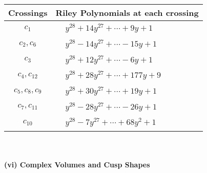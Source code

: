 \documentclass[1p]{elsarticle_modified}
\theoremstyle{definition}
\begin{document}
\begin{tabular}{m{50pt}|m{274pt}}
Crossings & \hspace{64pt}Riley Polynomials at each crossing \\
\hline $$\begin{aligned}c_{1}\end{aligned}$$&$\begin{aligned}
&y^{28}+14 y^{27}+\cdots+9 y+1
\end{aligned}$\\
\hline $$\begin{aligned}c_{2},c_{6}\end{aligned}$$&$\begin{aligned}
&y^{28}-14 y^{27}+\cdots-15 y+1
\end{aligned}$\\
\hline $$\begin{aligned}c_{3}\end{aligned}$$&$\begin{aligned}
&y^{28}+12 y^{27}+\cdots-6 y+1
\end{aligned}$\\
\hline $$\begin{aligned}c_{4},c_{12}\end{aligned}$$&$\begin{aligned}
&y^{28}+28 y^{27}+\cdots+177 y+9
\end{aligned}$\\
\hline $$\begin{aligned}c_{5},c_{8},c_{9}\end{aligned}$$&$\begin{aligned}
&y^{28}+30 y^{27}+\cdots+19 y+1
\end{aligned}$\\
\hline $$\begin{aligned}c_{7},c_{11}\end{aligned}$$&$\begin{aligned}
&y^{28}-28 y^{27}+\cdots-26 y+1
\end{aligned}$\\
\hline $$\begin{aligned}c_{10}\end{aligned}$$&$\begin{aligned}
&y^{28}-7 y^{27}+\cdots+68 y^2+1
\end{aligned}$\\
\hline
\end{tabular}\\~\\
\newpage\flushleft \textbf{(vi) Complex Volumes and Cusp Shapes}
\end{document}
